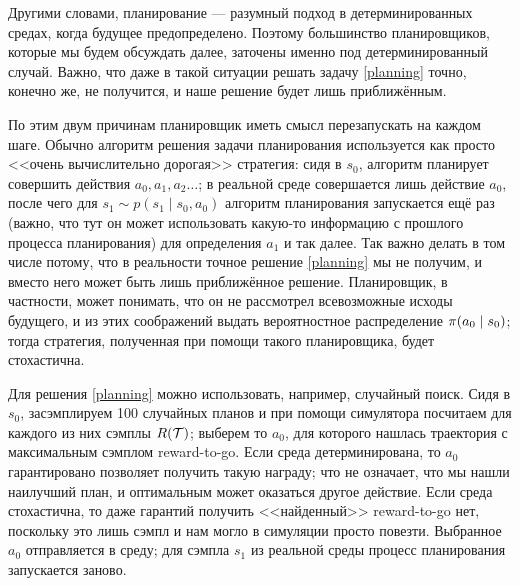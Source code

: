 Другими словами, планирование --- разумный подход в детерминированных средах, когда будущее предопределено. Поэтому большинство планировщиков, которые мы будем обсуждать далее, заточены именно под детерминированный случай. Важно, что даже в такой ситуации решать задачу \eqref{planning} точно, конечно же, не получится, и наше решение будет лишь приближённым. 

По этим двум причинам планировщик иметь смысл перезапускать на каждом шаге. Обычно алгоритм решения задачи планирования используется как просто <<очень вычислительно дорогая>> стратегия: сидя в $s_0$, алгоритм планирует совершить действия $a_0, a_1, a_2 \dots$; в реальной среде совершается лишь действие $a_0$, после чего для $s_1 \sim p(s_1 \mid s_0, a_0)$ алгоритм планирования запускается ещё раз (важно, что тут он может использовать какую-то информацию с прошлого процесса планирования) для определения $a_1$ и так далее. Так важно делать в том числе потому, что в реальности точное решение \eqref{planning} мы не получим, и вместо него может быть лишь приближённое решение. Планировщик, в частности, может понимать, что он не рассмотрел всевозможные исходы будущего, и из этих соображений выдать вероятностное распределение $\pi(a_0 \HM\mid s_0)$; тогда стратегия, полученная при помощи такого планировщика, будет стохастична.

\begin{example}
Для решения \eqref{planning} можно использовать, например, случайный поиск. Сидя в $s_0$, засэмплируем 100 случайных планов и при помощи симулятора посчитаем для каждого из них сэмплы $R(\mathcal{T})$; выберем то $a_0$, для которого нашлась траектория с максимальным сэмплом reward-to-go. Если среда детерминирована, то $a_0$ гарантировано позволяет получить такую награду; что не означает, что мы нашли наилучший план, и оптимальным может оказаться другое действие. Если среда стохастична, то даже гарантий получить <<найденный>> reward-to-go нет, поскольку это лишь сэмпл и нам могло в симуляции просто повезти. Выбранное $a_0$ отправляется в среду; для сэмпла $s_1$ из реальной среды процесс планирования запускается заново. 


\end{example}

